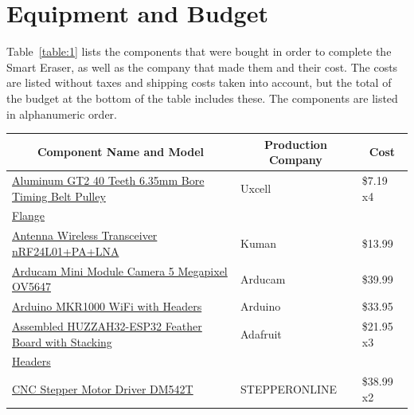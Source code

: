 \section{Equipment and Budget}
Table~\ref{table:1} lists the components that were bought in order to complete the Smart Eraser, as well as the company that made them and their cost. The costs are listed without taxes and shipping costs taken into account, but the total of the budget at the bottom of the table includes these. The components are listed in alphanumeric order.
\setlength{\parindent}{5ex}
\begin{table} [H]
	\normalsize
	\centering
	\begin{tabular}{|l|l|l|}
		\hline
		\multicolumn{1}{|c|}{\textbf{Component Name and Model}}  & 
		\multicolumn{1}{|c|}{\textbf{Production Company}}  & 
		\multicolumn{1}{|c|}{\textbf{Cost}} \\
		\hline
		\href{https://www.amazon.com/dp/B0728PDWY5/?coliid=I3K7SWFRMQ3A2F\&colid=22YAOKWOJAKA9\&psc=0\&ref_=lv_ov_lig_dp_it}{Aluminum GT2 40 Teeth 6.35mm Bore Timing Belt Pulley} 	& Uxcell 		& \$7.19 x4 \\
		\href{https://www.amazon.com/dp/B0728PDWY5/?coliid=I3K7SWFRMQ3A2F\&colid=22YAOKWOJAKA9\&psc=0\&ref_=lv_ov_lig_dp_it}{Flange} 	& 		& \\
		\hline
		\href{https://www.amazon.com/dp/B06VSYJ7HN/?coliid=I2N6U5HO8N5E5L\&colid=22YAOKWOJAKA9\&psc=0\&ref_=lv_ov_lig_dp_it}{Antenna Wireless Transceiver nRF24L01+PA+LNA} 	& Kuman 		& \$13.99 \\
		\hline
		\href{https://www.amazon.com/Arducam-Module-Camera-Arduino-Mega2560/dp/B013JUKZ48/ref=sr_1_fkmrnull_2_sspa?keywords=Arducam+Mini+Module+Camera+5+Megapixel+OV5647\&qid=1555715678\&s=gateway\&sr=8-2-fkmrnull-spons\&psc=1}{Arducam Mini Module Camera 5 Megapixel OV5647} 	& Arducam 		& \$39.99 \\
		\hline
		\href{https://store.arduino.cc/usa/arduino-mkr1000}{Arduino MKR1000 WiFi with Headers} 	& Arduino 		& \$33.95 \\
		\hline
		\href{https://www.adafruit.com/product/3619}{Assembled HUZZAH32-ESP32 Feather Board with Stacking} 	& Adafruit 		& \$21.95 x3 \\
		\href{https://www.adafruit.com/product/3619}{Headers} 	&  		&  \\
		\hline
		\href{https://www.amazon.com/dp/B06Y5VPSFN/?coliid=I1R941FDJ72L0R\&colid=22YAOKWOJAKA9\&psc=0\&ref_=lv_ov_lig_dp_it}{CNC Stepper Motor Driver DM542T} 	& STEPPERONLINE 		& \$38.99 x2 \\

\end{tabular}
\end{table}
